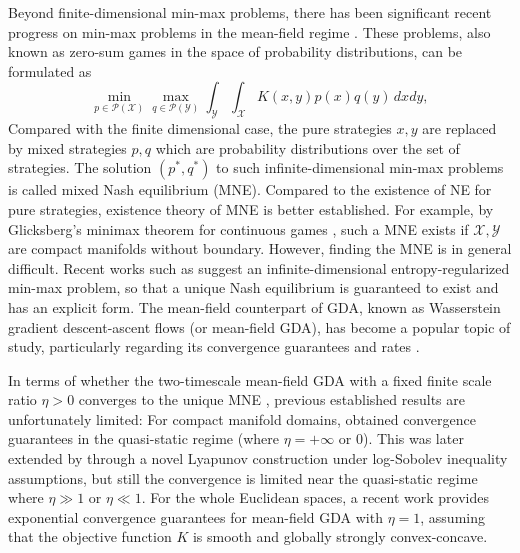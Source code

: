 \documentclass[11pt]{article}
\newcommand{\1}{\mathds{1}}
\begin{document}
Beyond finite-dimensional min-max problems, there has been significant recent progress on min-max problems in the mean-field regime \cite{hsieh2019finding, domingo2020mean, ma2022provably, lu2023two, wang2022exponentially, kimsymmetric, lascu2024fisher, conger2024coupled, cai2024convergence}. These problems, also known as zero-sum games in the space of probability distributions, can be formulated as
\begin{equation}\label{eq:Kxy}
    \min_{p\in\mathcal{P}(\mathcal{X})} \max_{q\in\mathcal{P}(\mathcal{Y})} \int_{\mathcal{Y}} \int_{\mathcal{X}} K(x,y) p(x) q(y) \, dx dy,
\end{equation}
Compared with the finite dimensional case, the pure strategies $x, y$ are replaced by mixed strategies $p,q$ which are probability distributions over the set of strategies.
The solution $(p^*,q^*)$ to such infinite-dimensional min-max problems is called mixed Nash equilibrium (MNE). Compared to the existence of NE for pure strategies, existence theory of MNE is better established. For example, by Glicksberg's minimax theorem for continuous games \cite{glicksberg1952further}, such a MNE exists if $\mathcal{X}, \mathcal{Y}$ are compact manifolds
without boundary.  However, finding the MNE is in general difficult. Recent works such as \cite{domingo2020mean} suggest an infinite-dimensional entropy-regularized min-max problem, so that a unique Nash equilibrium is guaranteed to exist and has an explicit form. The mean-field counterpart of GDA, known as Wasserstein gradient descent-ascent flows (or mean-field GDA), has become a popular topic of study, particularly regarding its convergence guarantees and rates \cite{wang2024open}. 

In terms of whether the two-timescale mean-field GDA with a fixed finite scale ratio $\eta>0$ converges to the unique MNE \cite{domingo2020mean, wang2024open}, previous established results are unfortunately limited: For compact manifold domains, \cite{ma2022provably} obtained convergence guarantees in the quasi-static regime (where $\eta = +\infty$ or $0$). This was later extended by \cite{lu2023two} through a novel Lyapunov construction under log-Sobolev inequality assumptions, but still the convergence is limited near the quasi-static regime where $\eta\gg 1$ or $\eta\ll 1$. For the whole Euclidean spaces, a recent work \cite{cai2024convergence}  provides exponential convergence guarantees for mean-field GDA with $\eta=1$, assuming that the objective function $K$ is smooth and globally strongly convex-concave.
\end{document}
